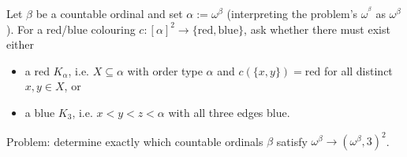 Let $\beta$ be a countable ordinal and set $\alpha:=\omega^\beta$ (interpreting the problem's $\omega^{^\beta}$ as $\omega^\beta$).
For a red/blue colouring $c:[\alpha]^2\to\{\text{red},\text{blue}\}$, ask whether there must exist either
\begin{itemize}
\item a red $K_\alpha$, i.e. $X\subseteq\alpha$ with order type $\alpha$ and $c(\{x,y\})=\text{red}$ for all distinct $x,y\in X$, or
\item a blue $K_3$, i.e. $x<y<z<\alpha$ with all three edges blue.
\end{itemize}

Problem: determine exactly which countable ordinals $\beta$ satisfy $\omega^\beta\to(\omega^\beta,3)^2$.
